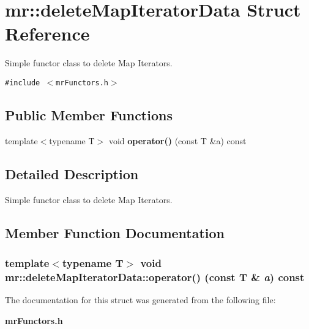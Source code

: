 \section{mr::delete\-Map\-Iterator\-Data Struct Reference}
\label{structmr_1_1deleteMapIteratorData}
Simple functor class to delete Map Iterators.  


{\tt \#include $<$mr\-Functors.h$>$}

\subsection*{Public Member Functions}
\begin{CompactItemize}
\item 
template$<$typename T$>$ void {\bf operator()} (const T \&a) const 
\end{CompactItemize}


\subsection{Detailed Description}
Simple functor class to delete Map Iterators. 



\subsection{Member Function Documentation}
\subsubsection{\setlength{\rightskip}{0pt plus 5cm}template$<$typename T$>$ void mr::delete\-Map\-Iterator\-Data::operator() (const T \& {\em a}) const\hspace{0.3cm}{\tt  [inline]}}\label{structmr_1_1deleteMapIteratorData_a0}




The documentation for this struct was generated from the following file:\begin{CompactItemize}
\item 
{\bf mr\-Functors.h}\end{CompactItemize}
